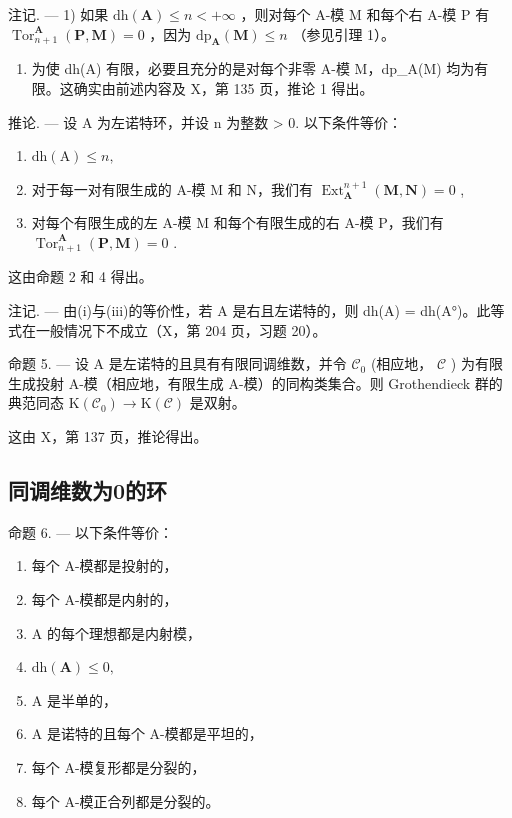 注记. --- 1) 如果 \(\mathrm{dh}(\mathbf{A}) \leqslant n < +\infty\) ，则对每个 A-模 M 和每个右 A-模 P 有 \(\operatorname{Tor}_{n+1}^{\mathbf{A}}(\mathbf{P}, \mathbf{M}) = 0\) ，因为 \(\mathrm{dp}_{\mathbf{A}}(\mathbf{M}) \leqslant n\) （参见引理 1）。

\begin{enumerate}
\def\labelenumi{\arabic{enumi})}
\setcounter{enumi}{1}
\tightlist
\item
  为使 dh(A) 有限，必要且充分的是对每个非零 A-模 M，dp\_A(M) 均为有限。这确实由前述内容及 X，第 135 页，推论 1 得出。
\end{enumerate}

推论. --- 设 A 为左诺特环，并设 n 为整数 \textgreater{} 0. 以下条件等价：

\begin{enumerate}
\def\labelenumi{(\roman{enumi})}
\item
  \(\mathrm{dh(A)}\leqslant n,\)
\item
  对于每一对有限生成的 A-模 M 和 N，我们有 \(\operatorname{Ext}_{\mathbf{A}}^{n+1}(\mathbf{M}, \mathbf{N}) = 0\) ,
\item
  对每个有限生成的左 A-模 M 和每个有限生成的右 A-模 P，我们有 \(\operatorname{Tor}_{n+1}^{\mathbf{A}}(\mathbf{P},\mathbf{M}) = 0\) .
\end{enumerate}

这由命题 2 和 4 得出。

注记. --- 由(i)与(iii)的等价性，若 A 是右且左诺特的，则 dh(A) = dh(A°)。此等式在一般情况下不成立（X，第 204 页，习题 20）。

命题 5. --- 设 A 是左诺特的且具有有限同调维数，并令 \(\mathcal{C}_{0}\) (相应地， \(\mathcal{C}\) ) 为有限生成投射 A-模（相应地，有限生成 A-模）的同构类集合。则 Grothendieck 群的典范同态 \(\mathrm{K}(\mathcal{C}_{0}) \to \mathrm{K}(\mathcal{C})\) 是双射。

这由 X，第 137 页，推论得出。

\subsection{同调维数为0的环}

命题 6. --- 以下条件等价：

\begin{enumerate}
\def\labelenumi{(\roman{enumi})}
\item
  每个 A-模都是投射的，
\item
  每个 A-模都是内射的，
\item
  A 的每个理想都是内射模，
\item
  \(\mathrm{dh}(\mathbf{A})\leqslant 0,\)
\item
  A 是半单的，
\item
  A 是诺特的且每个 A-模都是平坦的，
\item
  每个 A-模复形都是分裂的，
\item
  每个 A-模正合列都是分裂的。
\end{enumerate}

